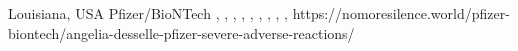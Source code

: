           {Louisiana, USA}
          {}
          {Pfizer/BioNTech}
          {}
          {
            ,
            ,
            ,
            ,
            ,
            ,
            ,
            ,
            ,
          }
          {https://nomoresilence.world/pfizer-biontech/angelia-desselle-pfizer-severe-adverse-reactions/}
